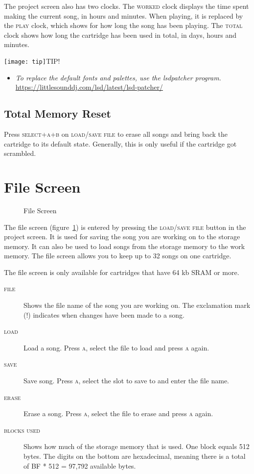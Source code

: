 The project screen also has two clocks.
The \textsc{worked} clock displays the time spent making the current song, in hours and minutes.
When playing, it is replaced by the \textsc{play} clock, which shows for how long the song has been playing.
The \textsc{total} clock shows how long the cartridge has been used in total, in days, hours and minutes.

\texttt{[image: tip]}TIP!
\begin{itemize}
\item \textit{To replace the default fonts and palettes, use the lsdpatcher program.} \url{https://littlesounddj.com/lsd/latest/lsd-patcher/}
\end{itemize}

\subsection{Total Memory Reset}
\label{total-memory-reset}

Press \textsc{select+a+b} on \textsc{load/save file} to erase all songs and bring back the cartridge to its default state.
Generally, this is only useful if the cartridge got scrambled.

\section{File Screen}

\begin{figure}[htpb]
	\begin{center}
	\end{center}
	\caption{File Screen}
	\label{fig:file}
\end{figure}

The file screen (figure~\ref{fig:file}) is entered by pressing the \textsc{load/save file} button in the project screen. It is used for saving the song you are working on to the storage memory. It can also be used to load songs from the storage memory to the work memory. The file screen allows you to keep up to 32 songs on one cartridge.

The file screen is only available for cartridges that have 64 kb SRAM or more.

\begin{description}
	\item[\textsc{file}] Shows the file name of the song you are working on. The exclamation mark (\textsc{!}) indicates when changes have been made to a song.
	\item[\textsc{load}] Load a song. Press \textsc{a}, select the file to load and press \textsc{a} again.
	\item[\textsc{save}] Save song. Press \textsc{a}, select the slot to save to and enter the file name.
	\item[\textsc{erase}] Erase a song. Press \textsc{a}, select the file to erase and press \textsc{a} again.
	\item[\textsc{blocks used}] Shows how much of the storage memory that is used. One block equals 512 bytes. The digits on the bottom are hexadecimal, meaning there is a total of BF * 512 = 97,792 available bytes.
\end{description}

